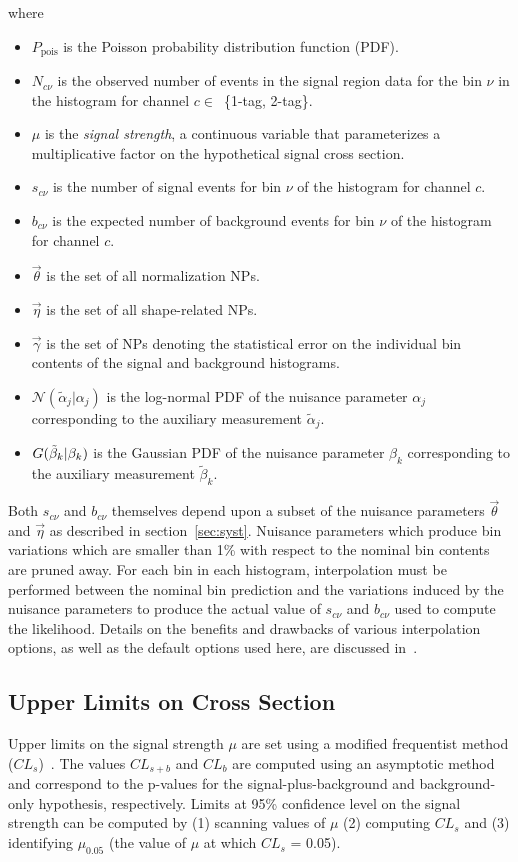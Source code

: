 where
\begin{itemize}
\itemsep -0.5em
    \item $P_{\mathrm{pois}}$ is the Poisson probability distribution function (PDF).
    \item $N_{c\nu}$ is the observed number of events in the signal region data for the bin $\nu$ in the histogram for channel $c \in$~\{1-tag, 2-tag\}.
    \item $\mu$ is the \textit{signal strength}, a continuous variable that parameterizes a multiplicative factor on the hypothetical signal cross section.
    \item $s_{c\nu}$ is the number of signal events for bin $\nu$ of the histogram for channel $c$.
    \item $b_{c\nu}$ is the expected number of background events for bin $\nu$ of the histogram for channel $c$.
    \item $\vec{\theta}$ is the set of all normalization NPs.
    \item $\vec{\eta}$ is the set of all shape-related NPs.
    \item $\vec{\gamma}$ is the set of NPs denoting the statistical error on the individual bin contents of the signal and background histograms.
    \item $\mathcal{N}(\tilde{\alpha}_{j} | \alpha_{j})$ is the log-normal PDF of the nuisance parameter $\alpha_j$ corresponding to the auxiliary measurement $\tilde{\alpha}_j$.
    \item $\mathnormal{G}(\tilde{\beta}_{k} | \beta_{k})$ is the Gaussian PDF of the nuisance parameter $\beta_k$ corresponding to the auxiliary measurement $\tilde{\beta}_k$.
\end{itemize}

Both $s_{c\nu}$ and $b_{c\nu}$ themselves depend upon a subset of the nuisance parameters $\vec{\theta}$ and $\vec{\eta}$ as described in section~\ref{sec:syst}.
Nuisance parameters which produce bin variations which are smaller than 1\% with respect to the nominal bin contents are pruned away.
For each bin in each histogram, interpolation must be performed between the nominal bin prediction and the variations induced by the nuisance parameters to produce the actual value of $s_{c\nu}$ and $b_{c\nu}$ used to compute the likelihood.
Details on the benefits and drawbacks of various interpolation options, as well as the default options used here, are discussed in~\cite{HistFactory2012}.

\subsection{Upper Limits on Cross Section}
Upper limits on the signal strength $\mu$ are set using a modified frequentist method ($CL_s$)~\cite{Read:451614}.
The values $CL_{s+b}$ and $CL_b$ are computed using an asymptotic method~\cite{asymptotics} and correspond to the p-values for the signal-plus-background and background-only hypothesis, respectively.
Limits at 95\% confidence level on the signal strength can be computed by (1) scanning values of $\mu$ (2) computing $CL_s$ and (3) identifying $\mu_{0.05}$ (the value of $\mu$ at which $CL_s$ = 0.05).

